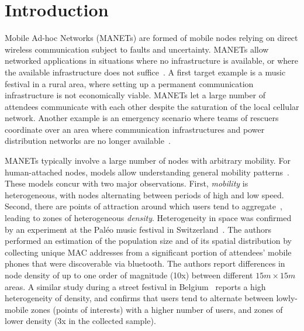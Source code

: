 
\section{Introduction}
\label{sec:introduction}

Mobile Ad-hoc Networks (MANETs) are formed of mobile nodes relying on direct wireless communication subject to faults and uncertainty.
MANETs allow networked applications in situations where no infrastructure is available, or where the available infrastructure does not suffice~\cite{overview_adhoc_networks,Bellavista2013}.
A first target example is a music festival in a rural area, where setting up a permanent communication infrastructure is not economically viable.
MANETs let a large number of attendees communicate with each other despite the saturation of the local cellular network.
Another example is an emergency scenario where teams of rescuers coordinate over an area where communication infrastructures and power distribution networks are no longer available~\cite{lieser2017architecture,verma2015manet}.

MANETs typically involve a large number of nodes with arbitrary mobility.
For human-attached nodes, models allow understanding general mobility patterns~\cite{Hess:2015:DHM:2856149.2840722,rhee2011levy}.
These models concur with two major observations.
First, \emph{mobility} is heterogeneous, with nodes alternating between periods of high and low speed.
Second, there are points of attraction around which users tend to aggregate~\cite{stepanov2005mobility_model_outdoor}, leading to zones of heterogeneous \emph{density}.
Heterogeneity in space was confirmed by an experiment at the Paléo music festival in Switzerland~\cite{naini2015opportunistic}.
The authors performed an estimation of the population size and of its spatial distribution by collecting unique MAC addresses from a significant portion of attendees' mobile phones that were discoverable via bluetooth.
The authors report differences in node density of up to one order of magnitude (10x) between different $15m\times 15m$ areas.
A similar study during a street festival in Belgium~\cite{versichele2012use} reports a high heterogeneity of density, and confirms that users tend to alternate between lowly-mobile zones (points of interests) with a higher number of users, and zones of lower density (3x in the collected sample).



